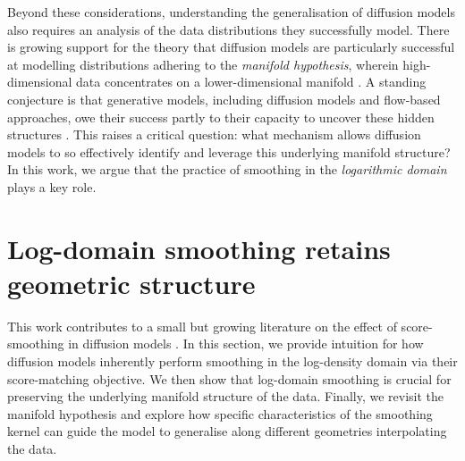 \documentclass[10pt]{article}
\theoremstyle{plain}
\theoremstyle{definition}
\theoremstyle{remark}
\begin{document}
Beyond these considerations, understanding the generalisation of diffusion models also requires an analysis of the data distributions they successfully model. There is growing support for the theory that diffusion models are particularly successful at modelling distributions adhering to the \emph{manifold hypothesis}, wherein high-dimensional data concentrates on a lower-dimensional manifold \citep{Tenenbaum_manifold_2000, Bengio2012RepresentationLA, Goodfellow16_DL}. A standing conjecture is that generative models, including diffusion models and flow-based approaches, owe their success partly to their capacity to uncover these hidden structures \citep{pidstrigach2022scorebased, de_bortoli2022convergence, loaiza-ganem2024deep,Farghly2025-fn}. This raises a critical question: what mechanism allows diffusion models to so effectively identify and leverage this underlying manifold structure? In this work, we argue that the practice of smoothing in the \emph{logarithmic domain} plays a key role.

\section{Log-domain smoothing retains geometric structure}\label{sec:intuition}

This work contributes to a small but growing literature on the effect of score-smoothing in diffusion models \citep{scarvelis2023closedformdiffusionmodels, chen2025interpolationeffectscoresmoothing, gabriel2025kernelsmoothedscoresdenoisingdiffusion}.
In this section, we provide intuition for how diffusion models inherently perform smoothing in the log-density domain via their score-matching objective. We then show that log-domain smoothing is crucial for preserving the underlying manifold structure of the data. Finally, we revisit the manifold hypothesis and explore how specific characteristics of the smoothing kernel can guide the model to generalise along different geometries interpolating the data.
\end{document}
